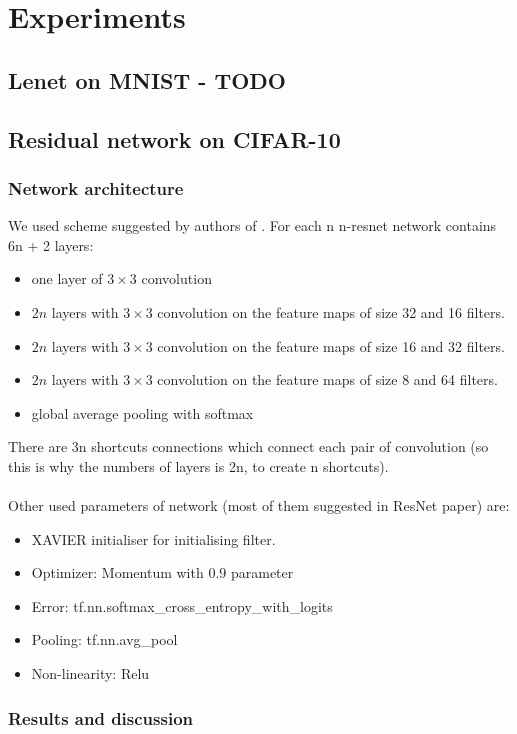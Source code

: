 \documentclass[licencjacka]{pracamgr}
\begin{document}
\chapter{Experiments}
	\section{Lenet on MNIST - TODO}
	\section{Residual network on CIFAR-10}
		\subsection{Network architecture}
			We used scheme suggested by authors of \cite{resnet}. For each n n-resnet network contains 6n + 2 layers:
			\begin{itemize}
			\item one layer of $3 \times 3$ convolution
			\item $2n$ layers with $3 \times 3$ convolution on the feature maps of size 32 and 16 filters.
			\item $2n$ layers with $3 \times 3$ convolution on the feature maps of size 16 and 32 filters.
			\item $2n$ layers with $3 \times 3$ convolution on the feature maps of size 8 and 64 filters.
			\item global average pooling with softmax
			\end{itemize}

			There are 3n shortcuts connections which connect each pair of convolution (so this is why the numbers of layers is 2n, to create n shortcuts).\\\\

			Other used parameters of network (most of them suggested in ResNet paper) are:
			\begin{itemize}
			\item XAVIER initialiser for initialising filter.
			\item Optimizer: Momentum with 0.9 parameter
			\item Error: tf.nn.softmax\_cross\_entropy\_with\_logits
			\item Pooling: tf.nn.avg\_pool
			\item Non-linearity: Relu
			\end{itemize}
		\subsection{Results and discussion}
\end{document}
